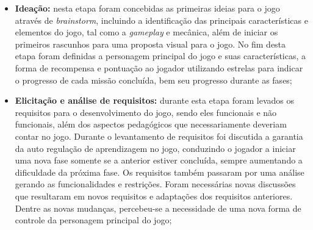 \documentclass[10pt, conference, compsocconf]{IEEEtran}
\begin{document}
\begin{itemize}
	\item \textbf{Ideação:} nesta etapa foram concebidas as primeiras ideias para o jogo através de \textit{brainstorm}, incluindo a identificação das principais características e elementos do jogo, tal como a \textit{gameplay} e mecânica, além de iniciar os primeiros rascunhos para uma proposta visual para o jogo. No fim desta etapa foram definidas a personagem principal do jogo e suas características, a forma de recompensa e pontuação ao jogador utilizando estrelas para indicar o progresso de cada missão concluída, bem seu progresso durante as fases;
	

	

	
	\item \textbf{Elicitação e análise de requisitos:} durante esta etapa foram levados os requisitos para o desenvolvimento do jogo, sendo eles funcionais e não funcionais, além dos aspectos pedagógicos que necessariamente deveriam contar no jogo. Durante o levantamento de requisitos foi discutida a garantia da auto regulação de aprendizagem no jogo, conduzindo o jogador a iniciar uma nova fase somente se a anterior estiver concluída, sempre aumentando a dificuldade da próxima fase. Os requisitos também passaram por uma análise gerando as funcionalidades e restrições. Foram necessárias novas discussões que resultaram em novos requisitos e adaptações dos requisitos anteriores. Dentre as novas mudanças, percebeu-se a necessidade de uma nova forma de controle da personagem principal do jogo;
	

\end{itemize}
\end{document}
